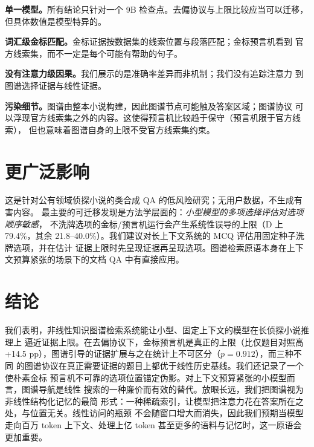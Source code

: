 \documentclass[UTF8,11pt]{ctexart}
\newcommand{\pp}{\ensuremath{\,\mathrm{pp}}}
\begin{document}
\textbf{单一模型。}所有结论只针对一个 9B 检查点。去偏协议与上限比较应当可以迁移，
但具体数值是模型特异的。

\textbf{词汇级金标匹配。}金标证据按数据集的线索位置与段落匹配；金标预言机看到
官方线索集，而不一定是每个可能有帮助的句子。

\textbf{没有注意力级因果。}我们展示的是准确率差异而非机制；我们没有追踪注意力
到图谱选择证据与线性证据。

\textbf{污染细节。}图谱由整本小说构建，因此图谱节点可能触及答案区域；图谱协议
可以浮现官方线索集之外的内容。这使得预言机比较趋于保守（预言机限于官方线索），
但也意味着图谱自身的上限不受官方线索集约束。

\section{更广泛影响}
\label{sec:impact}

这是针对公有领域侦探小说的类合成 QA 的低风险研究；无用户数据，不生成有害内容。
最主要的可迁移发现是方法学层面的：\emph{小型模型的多项选择评估对选项顺序敏感}，
不洗牌选项的金标/预言机运行会产生系统性误导的上限（D 上 79.4\%，其余
21.8--40.0\%）。我们建议对长上下文系统的 MCQ 评估用固定种子洗牌选项，并在估计
证据上限时先呈现证据再呈现选项。图谱检索原语本身在上下文预算紧张的场景下的文档
QA 中有直接应用。

\section{结论}
\label{sec:conclusion}

我们表明，非线性知识图谱检索系统能让小型、固定上下文的模型在长侦探小说推理上
逼近证据上限。在去偏协议下，金标预言机是真正的上限（比仅题目对照高
+14.5\,\pp），图谱引导的证据扩展与之在统计上不可区分（$p=0.912$），而三种不同
的图谱协议在真正需要证据的题目上都优于线性历史基线。我们还记录了一个使朴素金标
预言机不可靠的选项位置锚定伪影。对上下文预算紧张的小模型而言，图谱导航是线性
搜索的一种廉价而有效的替代。放眼长远，我们把图谱视为非线性结构化记忆的最简
形式：一种稀疏索引，让模型把注意力花在答案所在之处，与位置无关。线性访问的瓶颈
不会随窗口增大而消失，因此我们预期当模型走向百万 token 上下文、处理上亿 token
甚至更多的语料与记忆时，这一原语会更加重要。



\end{document}
